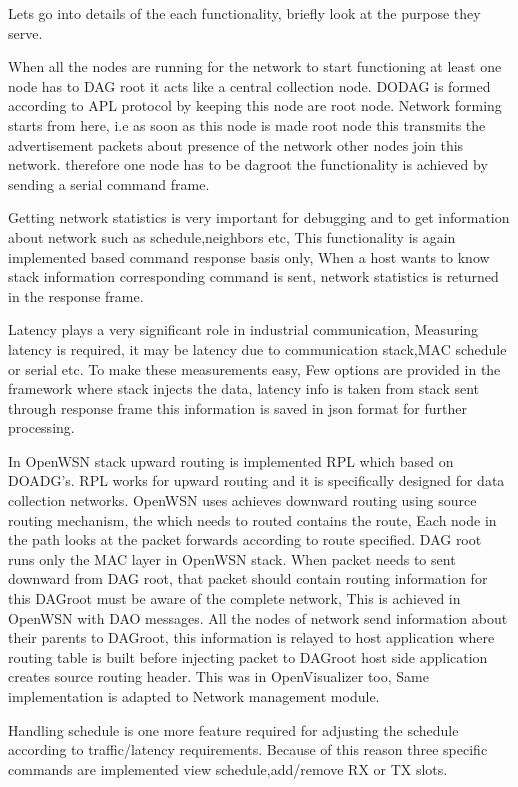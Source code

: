 Lets go into details of the each functionality, briefly look at the purpose they serve.

When all the nodes are running for the network to start functioning at least one node has to DAG root it acts like a central collection node. DODAG is formed according to APL protocol by keeping this node are root node. Network forming starts from here, i.e as soon as this node is made root node this transmits the advertisement packets about presence of the network other nodes join this network. therefore one node has to be dagroot the functionality is achieved by sending a serial command frame.

Getting network statistics is very important for debugging and to get information about network such as schedule,neighbors etc, This functionality is again implemented based command response basis only, When a host wants to know stack information corresponding command is sent, network statistics is returned in the response frame.

Latency plays a very significant role in industrial communication, Measuring latency is required, it may be latency due to communication stack,MAC schedule or serial etc. To make these measurements easy, Few options are provided in the framework where stack injects the data, latency info is taken from stack sent through response frame this information is saved in json format for further processing.
 
In OpenWSN stack upward routing is implemented RPL\cite{GADDOUR20123163} which based on DOADG's. RPL works for upward routing and it is specifically designed for data collection networks. OpenWSN uses achieves downward routing using source routing mechanism, the which needs to routed contains the route, Each node in the path looks at the packet forwards according to route specified. DAG root runs only the MAC layer in OpenWSN stack. When packet needs to sent downward from DAG root, that packet should contain routing information for this DAGroot must be aware of the complete network, This is achieved in OpenWSN with DAO messages. All the nodes of network send information about their parents to DAGroot, this information is relayed to host application where routing table is built before injecting packet to DAGroot host side application creates source routing header. This was in OpenVisualizer too, Same implementation is adapted to Network management module.

Handling schedule is one more feature required for adjusting the schedule according to traffic/latency requirements. Because of this reason three specific commands are implemented view schedule,add/remove RX or TX slots.

